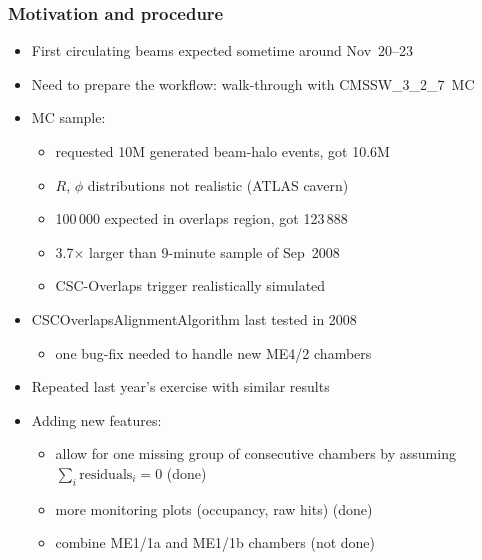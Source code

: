 \documentclass[compress]{beamer}
\begin{document}
\begin{frame}
\frametitle{Motivation and procedure}
\begin{itemize}
\item First circulating beams expected sometime around Nov~20--23
\item Need to prepare the workflow: walk-through with \mbox{CMSSW\_3\_2\_7 MC\hspace{-1 cm}}
\item MC sample:
\begin{itemize}
\item requested 10M generated beam-halo events, got 10.6M
\item $R$, $\phi$ distributions not realistic (ATLAS cavern)
\item 100$\,$000 expected in overlaps region, got 123$\,$888
\item 3.7$\times$ larger than 9-minute sample of Sep~2008
\item CSC-Overlaps trigger realistically simulated
\end{itemize}

\item CSCOverlapsAlignmentAlgorithm last tested in 2008
\begin{itemize}
\item one bug-fix needed to handle new ME4/2 chambers
\end{itemize}

\item Repeated last year's exercise with similar results

\item Adding new features:
\begin{itemize}
\item allow for one missing group of consecutive chambers by assuming $\sum_i \mbox{residuals}_i = 0$ \hfill {\scriptsize (done)}
\item more monitoring plots (occupancy, raw hits) \hfill {\scriptsize (done)}
\item combine ME1/1a and ME1/1b chambers \hfill {\scriptsize (not done)}
\end{itemize}

\end{itemize}
\end{frame}
\end{document}
